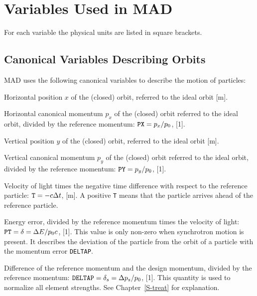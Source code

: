 \section{Variables Used in MAD}
\label{S-VARIA}
For each variable the physical units are listed in square brackets.

\subsection{Canonical Variables Describing Orbits}
\label{S-CANON}
MAD uses the following canonical variables
to describe the motion of particles:

\begin{mylist}
Horizontal position \(x\) of the (closed) orbit,
referred to the ideal orbit [m].

Horizontal canonical momentum \(p_{x}\) of the (closed) orbit
referred to the ideal orbit, divided by the reference momentum:
\(\hbox{\tt PX}=p_x/p_0\), [1].

Vertical position \(y\) of the (closed) orbit,
referred to the ideal orbit [m].

Vertical canonical momentum \(p_{y}\) of the (closed) orbit
referred to the ideal orbit, divided by the reference momentum:
\(\hbox{\tt PY}=p_y/p_0\), [1].

Velocity of light times the negative time difference
with respect to the reference particle:
\(\hbox{\tt T}=-c\Delta t\), [m].
A positive {\tt T} means that the particle arrives ahead
of the reference particle.

Energy error, divided by the reference momentum times the velocity
of light:
\(\hbox{\tt PT}=\delta =\Delta E/p_{0}c\), [1].
This value is only non-zero when synchrotron motion is present.
It describes the deviation of the particle from the orbit of a
particle with the momentum error {\tt DELTAP}.

Difference of the reference momentum and the design momentum,
divided by the reference momentum:
\(\hbox{\tt DELTAP}=\delta_s =\Delta p_s/p_0\), [1].
This quantity is used to normalize all element strengths.
See Chapter~\ref{S-treat} for explanation.
\end{mylist}

